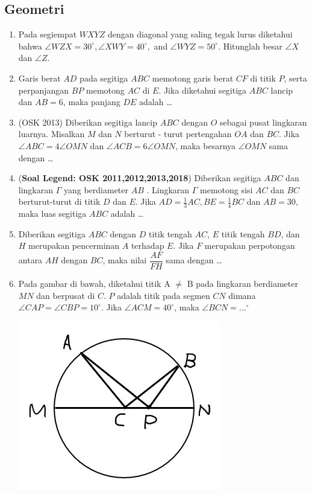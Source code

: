 \documentclass[11pt]{scrartcl}
\begin{document}
\subsection{Geometri}
\begin{enumerate}
    \item Pada segiempat $WXYZ$ dengan diagonal yang saling tegak lurus diketahui bahwa $\angle WZX = 30^\circ, \angle XWY = 40^\circ,$ and $\angle WYZ = 50^\circ$. Hitunglah besar $\angle X$ dan $\angle Z$.
    
    \item
		Garis berat $AD$ pada segitiga $ABC$ memotong garis berat $CF$ di titik $P$, serta perpanjangan $BP$ memotong $AC$ di $E$. Jika diketahui segitiga $ABC$ lancip dan $AB=6$, maka panjang $DE$ adalah \dots
		
	\item (OSK 2013) Diberikan segitiga lancip $ABC$ dengan $O$ sebagai pusat lingkaran luarnya. Misalkan $M$ dan $N$
berturut - turut pertengahan $OA$ dan $BC$. Jika $\angle ABC = 4\angle OMN$ dan $\angle ACB = 6\angle OMN$,
maka besarnya $\angle OMN$ sama dengan \dots

    \item (\textbf{Soal Legend: OSK 2011,2012,2013,2018}) Diberikan segitiga $ABC$ dan lingkaran $\Gamma$ yang berdiameter $AB$ . Lingkaran $\Gamma$ memotong sisi $AC$ dan $BC$
berturut-turut di titik $D$ dan $E$. Jika $AD = \frac13 AC, BE =\frac14 BC$ dan $AB = 30$, maka luas segitiga $ABC$ adalah \dots
		
	\item
		Diberikan segitiga $ABC$ dengan $D$ titik tengah $AC$, $E$ titik tengah $BD$, dan $H$ merupakan pencerminan $A$ terhadap $E$. Jika $F$ merupakan perpotongan antara $AH$ dengan $BC$, maka nilai $\dfrac{AF}{FH}$ sama dengan \dots
		
	\item 	
		 Pada gambar di bawah, diketahui titik A $\ne$ B pada lingkaran berdiameter $MN$ dan berpusat di $C$. $P$ adalah titik pada segmen $CN$ dimana $\angle CAP = \angle CBP = 10 ^\circ$. Jika $\angle ACM = 40^\circ$, maka $\angle BCN = \dots^\circ$
		 
		 \includegraphics[scale=0.7]{pemanasan post test geom}
		 

\end{enumerate}
\end{document}
